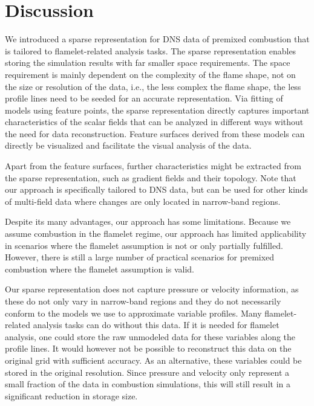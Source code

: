 \section{Discussion}
\label{sec:conclusion}
%
We introduced a sparse representation for \ac{DNS} data of premixed combustion
that is tailored to flamelet-related analysis tasks.
%
The sparse representation enables storing the simulation results with far
smaller space requirements.
%
The space requirement is mainly dependent on the complexity of the flame shape,
not on the size or resolution of the data, i.e., the less complex the flame
shape, the less profile lines need to be seeded for an accurate representation.
%
Via fitting of models using feature points, the sparse representation directly
captures important characteristics of the scalar fields that can be analyzed in
different ways without the need for data reconstruction.
%
Feature surfaces derived from these models can directly be visualized and
facilitate the visual analysis of the data.
%


Apart from the feature surfaces, further characteristics might be extracted from
the sparse representation, such as gradient fields and their topology.
%
Note that our approach is specifically tailored to \ac{DNS} data, but can be
used for other kinds of multi-field data where changes are only located in
narrow-band regions.

%
Despite its many advantages, our approach has some limitations.
%
Because we assume combustion in the flamelet regime, our approach has limited
applicability in scenarios where the flamelet assumption is not or only
partially fulfilled.
%
However, there is still a large number of practical scenarios for premixed
combustion where the flamelet assumption is valid.
%

%
Our sparse representation does not capture pressure or velocity information, as
these do not only vary in narrow-band regions and they do not necessarily
conform to the models we use to approximate variable profiles.
%
Many flamelet-related analysis tasks can do without this data.
%
If it is needed for flamelet analysis, one could store the raw unmodeled data
for these variables along the profile lines.
%
It would however not be possible to reconstruct this data on the original grid
with sufficient accuracy.
%
As an alternative, these variables could be stored in the original resolution.
%
Since pressure and velocity only represent a small fraction of the data in
combustion simulations, this will still result in a significant reduction in
storage size.
%

